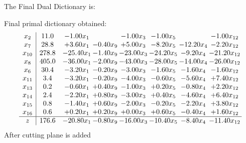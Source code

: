 \documentclass[8pt]{article}
\begin{document}
The Final Dual Dictionary is: 

 Final primal dictionary obtained: 
\[\begin{array}{c| c c@{\hskip 2pt} c@{\hskip 2pt} c@{\hskip 2pt} c@{\hskip 2pt} c@{\hskip 2pt} c@{\hskip 2pt} }
 x_{2}   &  11.0 & -1.00 x_{1} &   & -1.00 x_{3} & -1.00 x_{5} &   & -1.00 x_{12}\\
 x_{7}   &  28.8 & +  3.60 x_{1} & -0.40 x_{9} & +  5.00 x_{3} & -8.20 x_{5} & -12.20 x_{4} & -2.20 x_{12}\\
 x_{10}   &  278.8 & -25.40 x_{1} & -1.40 x_{9} & -23.00 x_{3} & -24.20 x_{5} & -9.20 x_{4} & -21.20 x_{12}\\
 x_{8}   &  405.0 & -36.00 x_{1} & -2.00 x_{9} & -43.00 x_{3} & -28.00 x_{5} & -14.00 x_{4} & -26.00 x_{12}\\
 x_{6}   &  30.4 & -3.20 x_{1} & -0.20 x_{9} & -3.00 x_{3} & -1.60 x_{5} & -1.60 x_{4} & -1.60 x_{12}\\
 x_{11}   &  3.4 & -3.20 x_{1} & -0.20 x_{9} & -4.00 x_{3} & -0.60 x_{5} & -5.60 x_{4} & +  7.40 x_{12}\\
 x_{13}   &  0.2 & -0.60 x_{1} & +  0.40 x_{9} & -1.00 x_{3} & +  0.20 x_{5} & -0.80 x_{4} & +  2.20 x_{12}\\
 x_{14}   &  2.4 & -2.20 x_{1} & +  0.80 x_{9} & -3.00 x_{3} & +  0.40 x_{5} & -4.60 x_{4} & +  6.40 x_{12}\\
 x_{15}   &  0.8 & -1.40 x_{1} & +  0.60 x_{9} & -2.00 x_{3} & -0.20 x_{5} & -2.20 x_{4} & +  3.80 x_{12}\\
 x_{16}   &  0.6 & +  0.20 x_{1} & +  0.20 x_{9} & +  0.00 x_{3} & +  0.60 x_{5} & -0.40 x_{4} & +  1.60 x_{12}\\
\hline
z    &  176.6 & -20.80 x_{1} & -0.80 x_{9} & -16.00 x_{3} & -10.40 x_{5} & -8.40 x_{4} & -11.40 x_{12}\\
\end{array}\]
 After cutting plane is added 
\end{document}
